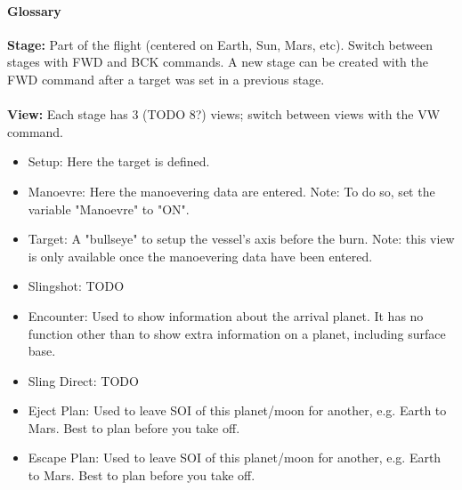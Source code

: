 \documentclass[Orbiter User Manual.tex]{subfiles}
\begin{document}
\paragraph{Glossary}
\textbf{Stage:} Part of the flight (centered on Earth, Sun, Mars, etc). Switch between stages with FWD and BCK commands. A new stage can be created with the FWD command after a target was set in a previous stage.\\
\\
\textbf{View:} Each stage has 3 (TODO 8?) views; switch between views with the VW command.
\begin{itemize}
\item Setup: Here the target is defined.
\item Manoevre: Here the manoevering data are entered. Note: To do so, set the variable "Manoevre" to "ON".
\item Target: A "bullseye" to setup the vessel's axis before the burn. Note: this view is only available once the manoevering data have been entered.

\item Slingshot: TODO
\item Encounter: Used to show information about the arrival planet. It has no function other than to show extra information on a planet, including surface base.
\item Sling Direct: TODO
\item Eject Plan: Used to leave SOI of this planet/moon for another, e.g. Earth to Mars. Best to plan before you take off.
\item Escape Plan: Used to leave SOI of this planet/moon for another, e.g. Earth to Mars. Best to plan before you take off.
\end{itemize}

\noindent
\end{document}
